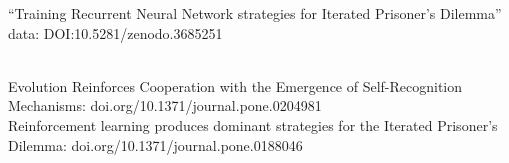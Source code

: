 \documentclass{beamer}
\begin{document}
\begin{frame}
    \begin{center}
    
    \end{center}
\end{frame}


\begin{frame}
    \begin{center}
    
    \end{center}
\end{frame}

\begin{frame}
    \begin{center}
    
    \end{center}
\end{frame}

\begin{frame}
    \begin{center}
    
    \end{center}
\end{frame}

\begin{frame}
    \begin{center}
        \large{``Training Recurrent Neural Network strategies for Iterated Prisoner's Dilemma''} \\ \vspace{.5cm}
        \footnotesize{data: DOI:10.5281/zenodo.3685251}
    \end{center}
\end{frame}
\begin{frame}
    \begin{center}
     \\ \vspace{.5cm}
    \pause
    \small{Evolution Reinforces Cooperation with the Emergence of Self-Recognition Mechanisms: doi.org/10.1371/journal.pone.0204981} \\ \vspace{.5cm}
    \pause
    \small{Reinforcement learning produces dominant strategies for the Iterated Prisoner's Dilemma: doi.org/10.1371/journal.pone.0188046}
    \end{center}
\end{frame}
\end{document}
